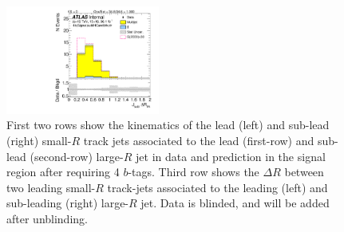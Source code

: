 \begin{figure}[htbp!]
\begin{center}
\includegraphics[angle=270, width=0.45\textwidth]{./figures/boosted/Signal/b77_FourTag_Signal_sublHCand_trk_dr_blind.pdf}
  \caption{First two rows show the kinematics of the lead (left) and sub-lead (right) small-$R$ track jets associated to the lead (first-row) and sub-lead (second-row) large-$R$ jet in data and prediction in the signal region after requiring 4 $b$-tags. Third row shows the $\Delta R$ between two leading small-$R$ track-jets associated to the leading (left) and sub-leading (right) large-$R$ jet. Data is blinded, and will be added after unblinding. }
  \label{fig:boosted-4b-signal-blind-ak2}
\end{center}
\end{figure}


